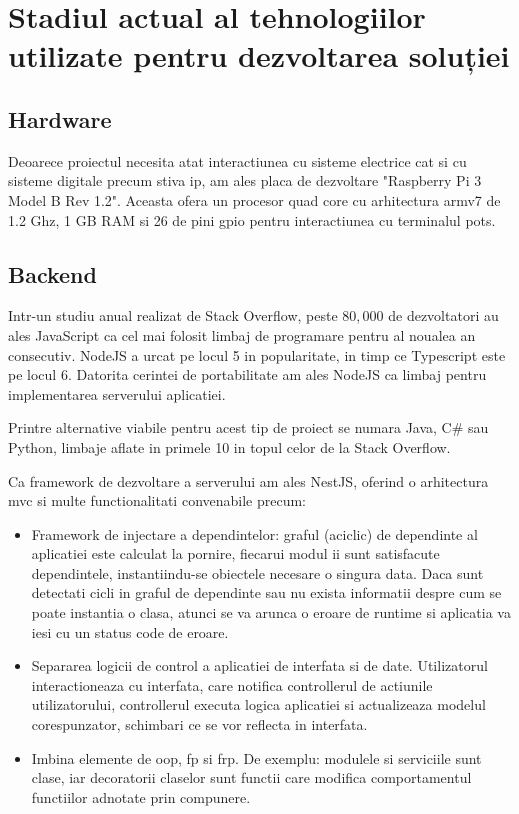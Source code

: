 \section {Stadiul actual al tehnologiilor utilizate pentru dezvoltarea soluției}

\subsection {Hardware}

Deoarece proiectul necesita atat interactiunea cu sisteme electrice cat si cu sisteme digitale precum stiva \acrshort{ip}, am ales placa de dezvoltare "Raspberry Pi 3 Model B Rev 1.2". Aceasta ofera un procesor quad core cu arhitectura armv7 de 1.2 Ghz, 1 GB RAM si 26 de pini \acrfull{gpio} pentru interactiunea cu terminalul \acrshort{pots}.

\subsection {Backend}

Intr-un studiu anual realizat de Stack Overflow, peste $80,000$ de dezvoltatori au ales JavaScript ca cel mai folosit limbaj de programare pentru al noualea an consecutiv. NodeJS a urcat pe locul 5 in popularitate, in timp ce Typescript este pe locul 6. Datorita cerintei de portabilitate am ales NodeJS ca limbaj pentru implementarea serverului aplicatiei. \cite{StackOverflow2021Survey}

Printre alternative viabile pentru acest tip de proiect se numara Java, C\# sau Python, limbaje aflate in primele 10 in topul celor de la Stack Overflow.

Ca framework de dezvoltare a serverului am ales NestJS, oferind o arhitectura \acrfull{mvc} si multe functionalitati convenabile precum:

\begin{itemize}
  \item Framework de injectare a dependintelor: graful (aciclic) de dependinte al aplicatiei este calculat la pornire, fiecarui modul ii sunt satisfacute dependintele, instantiindu-se obiectele necesare o singura data. Daca sunt detectati cicli in graful de dependinte sau nu exista informatii despre cum se poate instantia o clasa, atunci se va arunca o eroare de runtime si aplicatia va iesi cu un status code de eroare. 
  \item Separarea logicii de control a aplicatiei de interfata si de date. Utilizatorul interactioneaza cu interfata, care notifica controllerul de actiunile utilizatorului, controllerul executa logica aplicatiei si actualizeaza modelul corespunzator, schimbari ce se vor reflecta in interfata.
  \item Imbina elemente de \acrfull{oop}, \acrfull{fp} si \acrfull{frp}. De exemplu: modulele si serviciile sunt clase, iar decoratorii claselor sunt functii care modifica comportamentul functiilor adnotate prin compunere.

\end{itemize}


